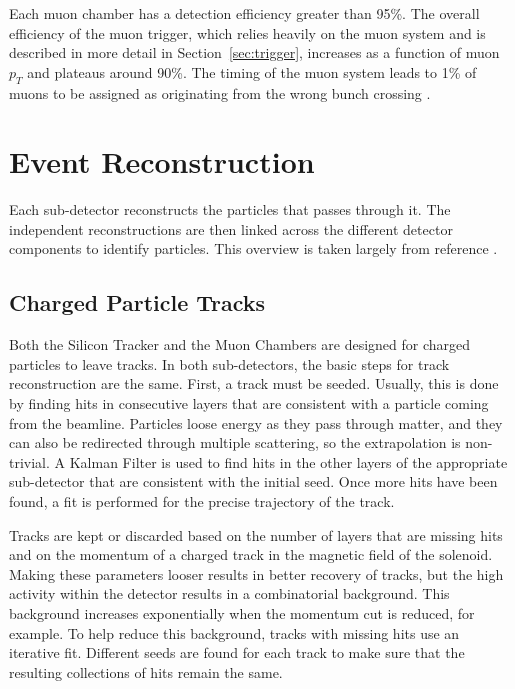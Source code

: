 Each muon chamber has a detection efficiency greater than 95\%.
The overall efficiency of the muon trigger, which relies heavily on the muon system
and is described in more detail in Section~\ref{sec:trigger},
increases as a function of muon $p_T$ and plateaus around 90\%.
The timing of the muon system leads to 1\% of muons
to be assigned as originating from the wrong bunch crossing \cite{Pozzobon_2019}.

\section{Event Reconstruction} \label{sec:event-reco}

Each sub-detector reconstructs the particles that passes through it.
The independent reconstructions are then linked
across the different detector components to identify particles.
This overview is taken largely from reference \cite{Sirunyan_2017}.

\subsection{Charged Particle Tracks} \label{sec:tracks}

Both the Silicon Tracker and the Muon Chambers are designed
for charged particles to leave tracks.
In both sub-detectors, the basic steps for track reconstruction are the same.
First, a track must be seeded.
Usually, this is done by finding hits in consecutive layers that are consistent
with a particle coming from the beamline.
Particles loose energy as they pass through matter,
and they can also be redirected through multiple scattering,
so the extrapolation is non-trivial.
A Kalman Filter is used to find hits in the other layers of the appropriate sub-detector
that are consistent with the initial seed.
Once more hits have been found, a fit is performed for the precise trajectory of the track.

Tracks are kept or discarded based on the number of layers that are missing hits
and on the momentum of a charged track in the magnetic field of the solenoid.
Making these parameters looser results in better recovery of tracks,
but the high activity within the detector results in a combinatorial background.
This background increases exponentially when the momentum cut is reduced, for example.
To help reduce this background, tracks with missing hits use an iterative fit.
Different seeds are found for each track to make sure that the resulting collections
of hits remain the same.

